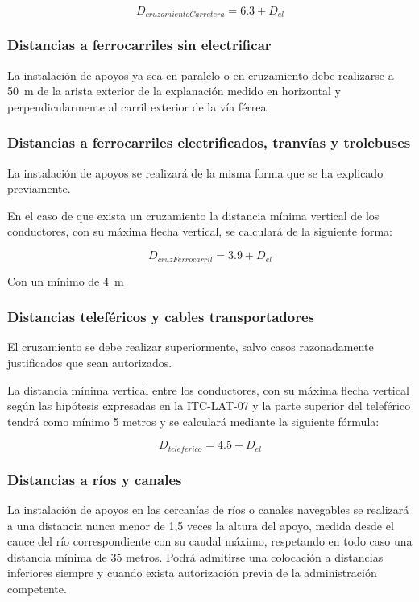 \begin{equation}
    D_{cruzamientoCarretera}=6.3+D_{el}
    \label{eq:dist-otras-cruzCarretera}
\end{equation}
\subsubsection{Distancias a ferrocarriles sin electrificar}
\label{subsubsec:otras-ferrocarriles}
La instalación de apoyos ya sea en paralelo o en cruzamiento debe realizarse a \SI{50}{\meter} de la arista exterior de la explanación medido en horizontal y perpendicularmente al carril exterior de la vía férrea. 

\subsubsection{Distancias a ferrocarriles electrificados, tranvías y trolebuses}
\label{subsubsec:otras-ferrocarrilesElec}
La instalación de apoyos se realizará de la misma forma que se ha explicado previamente. 

En el caso de que exista un cruzamiento la distancia mínima vertical de los conductores, con su máxima flecha vertical, se calculará de la siguiente forma:

\begin{equation}
    D_{cruzFerrocarril}=3.9+D_{el}
    \label{eq:dist-otras-cruzFerrocarril}
\end{equation}

Con un mínimo de \SI{4}{\meter}
\subsubsection{Distancias teleféricos y cables transportadores}
\label{subsubsec:otras-telefericos}
El cruzamiento se debe realizar superiormente, salvo casos razonadamente justificados que sean autorizados. 

La distancia mínima vertical entre los conductores, con su máxima flecha vertical según las hipótesis expresadas en la ITC-LAT-07 y la parte superior del teleférico tendrá como mínimo 5 metros y se calculará mediante la siguiente fórmula: 

\begin{equation}
    D_{teleferico} = 4.5+D_{el}
    \label{eq:dist-otras-teleferico}
\end{equation}
\subsubsection{Distancias a ríos y canales}
\label{subsubsec:otras-rios}
La instalación de apoyos en las cercanías de ríos o canales navegables se realizará a una distancia nunca menor de 1,5 veces la altura del apoyo, medida desde el cauce del río correspondiente con su caudal máximo, respetando en todo caso una distancia mínima de 35 metros. Podrá admitirse una colocación a distancias inferiores siempre y cuando exista autorización previa de la administración competente.

